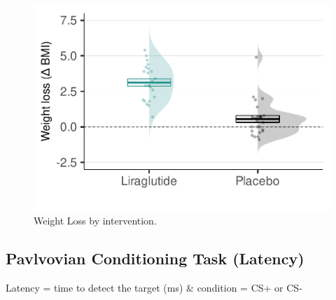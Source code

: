 \documentclass[
]{article}
\begin{document}
\begin{figure}

{\centering \includegraphics{OBIWAN_LIRA_files/figure-latex/Weight_Loss-1} 

}

\caption{Weight Loss by intervention.}\label{fig:Weight_Loss}
\end{figure}

\hfill\break
\hfill\break

\hypertarget{pavlvovian-conditioning-task-latency}{%
\subsection{Pavlvovian Conditioning Task
(Latency)}\label{pavlvovian-conditioning-task-latency}}

Latency = time to detect the target (ms) \& condition = CS+ or CS-\\

\hfill\break
\end{document}
